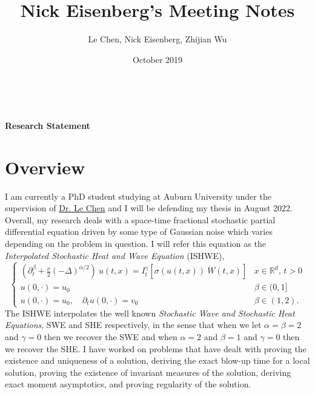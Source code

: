 \documentclass[a4paper,11pt]{article}
\title{Nick Eisenberg's Meeting Notes}
\author{Le Chen, Nick Eisenberg, Zhijian Wu}
\date{October 2019}
\numberwithin{equation}{section}
\theoremstyle{plain}
\theoremstyle{definition}
\newcommand{\R}{\mathbb{R}}
\numberwithin{NQ}{section}
\numberwithin{LQ}{section}
\numberwithin{ZQ}{section}
\begin{document}
\thispagestyle{fancy}
\fancyhf{}
$\;$
	\begin{center}	
		\huge{\textbf{Research Statement}}
	\end{center}

\section{Overview} I am currently a PhD student studying at Auburn University under the supervision of \href{http://webhome.auburn.edu/~lzc0090/}{Dr. Le Chen} and I will be defending my thesis in August 2022. Overall, my research deals with a space-time fractional stochastic partial differential equation driven by some type of Gaussian noise which varies depending on the problem in question. I will refer this equation as the {\it Interpolated Stochastic Heat and Wave Equation} (ISHWE),
	\begin{equation}
	\label{E:ISHWE}
		\begin{cases}
		\left(\partial^\beta_t + \frac{\nu}{2}(-\Delta)^{\alpha/2}\right)\: u(t,x) = I^\gamma_t \left[\sigma( u(t,x)) \: \dot W(t,x) \right] & \text{$x\in \R^d$, $t>0$} \\
		u(0,\cdot) = u_0                                                                                                            & \beta \in (0,1]               \\
		u(0,\cdot) = u_0, \quad \partial_t u(0,\cdot) = v_0                                                                            & \beta \in (1,2).
		\end{cases}
	\end{equation}
The ISHWE interpolates the well known {\it Stochastic Wave and Stochastic Heat Equations}, SWE and SHE respectively, in the sense that when we let $\alpha = \beta =2$ and $\gamma =0$ then we recover the SWE and when $\alpha =2$ and $\beta=1$ and $\gamma =0$ then we recover the SHE. I have worked on problems that have dealt with proving the existence and uniqueness of a solution, deriving the exact blow-up time for a local solution, proving the existence of invariant measures of the solution, deriving exact moment asymptotics, and proving regularity of the solution. 
\end{document}

